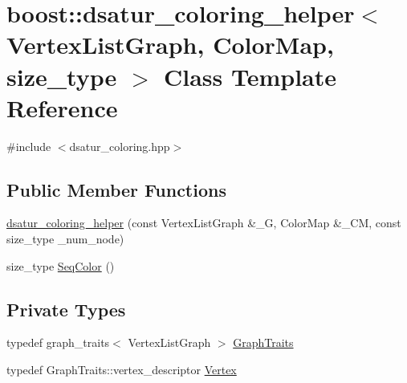\hypertarget{classboost_1_1dsatur__coloring__helper}{}\section{boost\+:\+:dsatur\+\_\+coloring\+\_\+helper$<$ Vertex\+List\+Graph, Color\+Map, size\+\_\+type $>$ Class Template Reference}
\label{classboost_1_1dsatur__coloring__helper}


{\ttfamily \#include $<$dsatur\+\_\+coloring.\+hpp$>$}

\subsection*{Public Member Functions}
\begin{DoxyCompactItemize}
\item 
\hyperlink{classboost_1_1dsatur__coloring__helper_a052af556756ff5557d84fe999d33f182}{dsatur\+\_\+coloring\+\_\+helper} (const Vertex\+List\+Graph \&\+\_\+G, Color\+Map \&\+\_\+\+CM, const size\+\_\+type \+\_\+num\+\_\+node)
\item 
size\+\_\+type \hyperlink{classboost_1_1dsatur__coloring__helper_a98b34621fd34aa9acf2ae7dcf1a54506}{Seq\+Color} ()
\end{DoxyCompactItemize}
\subsection*{Private Types}
\begin{DoxyCompactItemize}
\item 
typedef graph\+\_\+traits$<$ Vertex\+List\+Graph $>$ \hyperlink{classboost_1_1dsatur__coloring__helper_a2e9fc525ccf3c7378f250043fccccd34}{Graph\+Traits}
\item 
typedef Graph\+Traits\+::vertex\+\_\+descriptor \hyperlink{classboost_1_1dsatur__coloring__helper_a7d628ed652e8500d17a93c38ab37e24b}{Vertex}
\end{DoxyCompactItemize}
